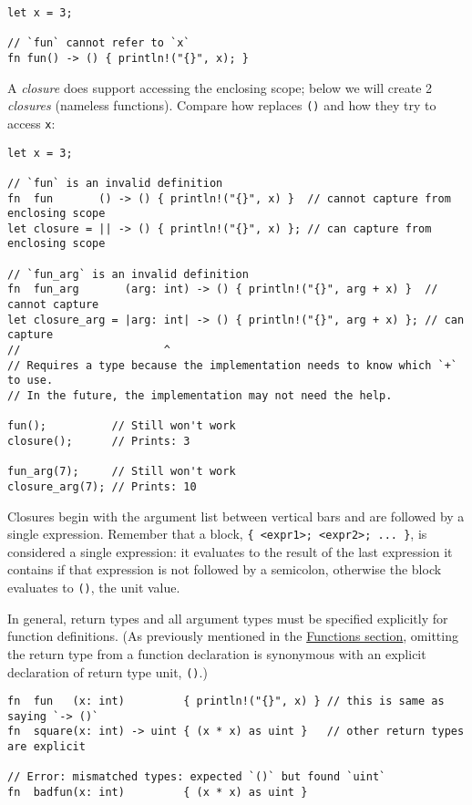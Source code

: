 \documentclass[]{article}
\begin{document}
\begin{verbatim}
let x = 3;

// `fun` cannot refer to `x`
fn fun() -> () { println!("{}", x); }
\end{verbatim}

A \emph{closure} does support accessing the enclosing scope; below we
will create 2 \emph{closures} (nameless functions). Compare how
\texttt{\textbar{}\textbar{}} replaces \texttt{()} and how they try to
access \texttt{x}:

\begin{verbatim}
let x = 3;

// `fun` is an invalid definition
fn  fun       () -> () { println!("{}", x) }  // cannot capture from enclosing scope
let closure = || -> () { println!("{}", x) }; // can capture from enclosing scope

// `fun_arg` is an invalid definition
fn  fun_arg       (arg: int) -> () { println!("{}", arg + x) }  // cannot capture
let closure_arg = |arg: int| -> () { println!("{}", arg + x) }; // can capture
//                      ^
// Requires a type because the implementation needs to know which `+` to use.
// In the future, the implementation may not need the help.

fun();          // Still won't work
closure();      // Prints: 3

fun_arg(7);     // Still won't work
closure_arg(7); // Prints: 10
\end{verbatim}

Closures begin with the argument list between vertical bars and are
followed by a single expression. Remember that a block,
\texttt{\{ \textless{}expr1\textgreater{}; \textless{}expr2\textgreater{}; ... \}},
is considered a single expression: it evaluates to the result of the
last expression it contains if that expression is not followed by a
semicolon, otherwise the block evaluates to \texttt{()}, the unit value.

In general, return types and all argument types must be specified
explicitly for function definitions. (As previously mentioned in the
\hyperref[functions]{Functions section}, omitting the return type from a
function declaration is synonymous with an explicit declaration of
return type unit, \texttt{()}.)

\begin{verbatim}
fn  fun   (x: int)         { println!("{}", x) } // this is same as saying `-> ()`
fn  square(x: int) -> uint { (x * x) as uint }   // other return types are explicit

// Error: mismatched types: expected `()` but found `uint`
fn  badfun(x: int)         { (x * x) as uint }
\end{verbatim}
\end{document}
